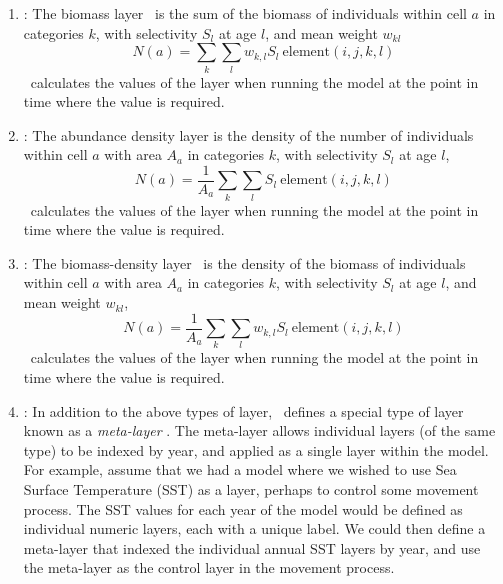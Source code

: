 \begin{enumerate}
\item {}: The biomass layer \NYI\ is the sum of the biomass of individuals within cell $a$ in categories $k$, with selectivity $S_l$ at age $l$, and mean weight $w_{kl}$
\begin{equation}
  N(a) = \sum\limits_{k} \sum\limits_l w_{k,l} S_l \ \text{element}(i,j,k,l) 
\end{equation}
\SPM\ calculates the values of the layer when running the model at the point in time where the value is required.

\item {}: The abundance density layer is the density of the number of individuals within cell $a$ with area $A_a$ in categories $k$, with selectivity $S_l$ at age $l$,
\begin{equation}
  N(a) = \frac{1}{A_a} \sum\limits_{k} \sum\limits_l S_l \ \text{element}(i,j,k,l)
\end{equation}
\SPM\ calculates the values of the layer when running the model at the point in time where the value is required.

\item {}: The biomass-density layer \NYI\ is the density of the biomass of individuals within cell $a$ with area $A_a$ in categories $k$, with selectivity $S_l$ at age $l$, and mean weight $w_{kl}$,
\begin{equation}
  N(a) = \frac{1}{A_a} \sum\limits_{k} \sum\limits_l w_{k,l} S_l \ \text{element}(i,j,k,l)
\end{equation}
\SPM\ calculates the values of the layer when running the model at the point in time where the value is required.

\item {\label{meta-layer}}: In addition to the above types of layer, \SPM\ defines a special type of layer known as a \emph{meta-layer} \NYI. The meta-layer allows individual layers (of the same type) to be indexed by year, and applied as a single layer within the model. For example, assume that we had a model where we wished to use Sea Surface Temperature (SST) as a layer, perhaps to control some movement process. The SST values for each year of the model would be defined as individual numeric layers, each with a unique label. We could then define a meta-layer that indexed the individual annual SST layers by year, and use the meta-layer as the control layer in the movement process.
\end{enumerate}

